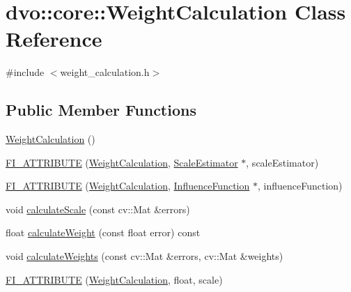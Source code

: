 \hypertarget{classdvo_1_1core_1_1_weight_calculation}{}\section{dvo\+:\+:core\+:\+:Weight\+Calculation Class Reference}
\label{classdvo_1_1core_1_1_weight_calculation}


{\ttfamily \#include $<$weight\+\_\+calculation.\+h$>$}

\subsection*{Public Member Functions}
\begin{DoxyCompactItemize}
\item 
\mbox{\hyperlink{classdvo_1_1core_1_1_weight_calculation_a253d03713e9f61c4ffafc18eb8f2d620}{Weight\+Calculation}} ()
\item 
\mbox{\hyperlink{classdvo_1_1core_1_1_weight_calculation_a6a12b73a656c81bfc0a97bcd88eb43a4}{F\+I\+\_\+\+A\+T\+T\+R\+I\+B\+U\+TE}} (\mbox{\hyperlink{classdvo_1_1core_1_1_weight_calculation}{Weight\+Calculation}}, \mbox{\hyperlink{classdvo_1_1core_1_1_scale_estimator}{Scale\+Estimator}} $\ast$, scale\+Estimator)
\item 
\mbox{\hyperlink{classdvo_1_1core_1_1_weight_calculation_af54b17f9cf42a43beb7556ea1ef78082}{F\+I\+\_\+\+A\+T\+T\+R\+I\+B\+U\+TE}} (\mbox{\hyperlink{classdvo_1_1core_1_1_weight_calculation}{Weight\+Calculation}}, \mbox{\hyperlink{classdvo_1_1core_1_1_influence_function}{Influence\+Function}} $\ast$, influence\+Function)
\item 
void \mbox{\hyperlink{classdvo_1_1core_1_1_weight_calculation_ac393845a22a31961ef9a5e2725a24a0a}{calculate\+Scale}} (const cv\+::\+Mat \&errors)
\item 
float \mbox{\hyperlink{classdvo_1_1core_1_1_weight_calculation_a224b958c290618f44627cb4368784019}{calculate\+Weight}} (const float error) const
\item 
void \mbox{\hyperlink{classdvo_1_1core_1_1_weight_calculation_a13b02fbc5bd70393d7108ef7b6e1cf40}{calculate\+Weights}} (const cv\+::\+Mat \&errors, cv\+::\+Mat \&weights)
\item 
\mbox{\hyperlink{classdvo_1_1core_1_1_weight_calculation_ae3d2c55437f00625058a67bd37d80826}{F\+I\+\_\+\+A\+T\+T\+R\+I\+B\+U\+TE}} (\mbox{\hyperlink{classdvo_1_1core_1_1_weight_calculation}{Weight\+Calculation}}, float, scale)
\end{DoxyCompactItemize}


